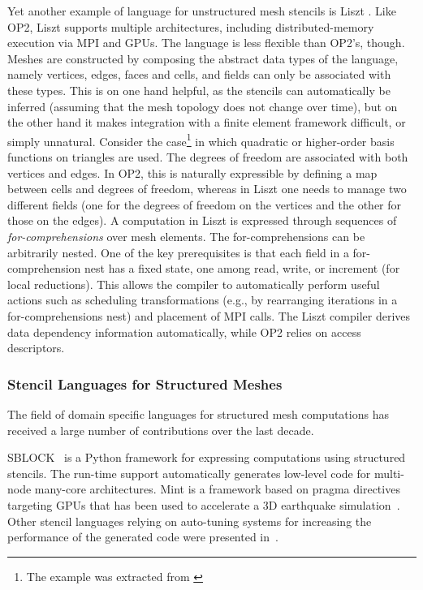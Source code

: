 Yet another example of language for unstructured mesh stencils is Liszt \citep{lizst}. Like OP2, Liszt supports multiple architectures, including distributed-memory execution via MPI and GPUs. The language is less flexible than OP2's, though. Meshes are constructed by composing the abstract data types of the language, namely vertices, edges, faces and cells, and fields can only be associated with these types. This is on one hand helpful, as the stencils can automatically be inferred (assuming that the mesh topology does not change over time), but on the other hand it makes integration with a finite element framework difficult, or simply unnatural. Consider the case\footnote{The example was extracted from \cite{florian-thesis}} in which quadratic or higher-order basis functions on triangles are used. The degrees of freedom are associated with both vertices and edges. In OP2, this is naturally expressible by defining a map between cells and degrees of freedom, whereas in Liszt one needs to manage two different fields (one for the degrees of freedom on the vertices and the other for those on the edges). A computation in Liszt is expressed through sequences of {\em for-comprehensions} over mesh elements. The for-comprehensions can be arbitrarily nested. One of the key prerequisites is that each field in a for-comprehension nest has a fixed state, one among read, write, or increment (for local reductions). This allows the compiler to automatically perform useful actions such as scheduling transformations (e.g., by rearranging iterations in a for-comprehensions nest) and placement of MPI calls. The Liszt compiler derives data dependency information automatically, while OP2 relies on access descriptors. 

\subsubsection{Stencil Languages for Structured Meshes}
The field of domain specific languages for structured mesh computations has received a large number of contributions over the last decade. 

SBLOCK~\citep{sblock-cite} is a Python framework for expressing computations using structured stencils. The run-time support automatically generates low-level code for multi-node many-core architectures. Mint is a framework based on pragma directives targeting GPUs that has been used to accelerate a 3D earthquake simulation~\citep{mint-simulation-cite}. Other stencil languages relying on auto-tuning systems for increasing the performance of the generated code were presented in~\cite{zhang-mueller-cite,datta-cite,patus}. 


